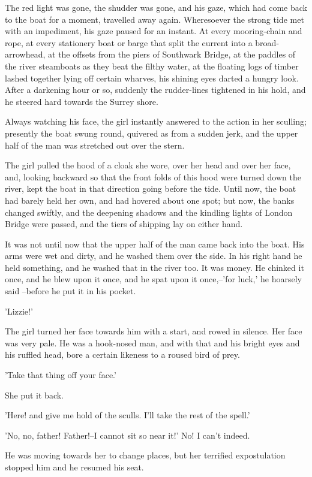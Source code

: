 The red light was gone, the shudder was gone, and his gaze, which
had come back to the boat for a moment, travelled away again.
Wheresoever the strong tide met with an impediment, his gaze
paused for an instant. At every mooring-chain and rope, at every
stationery boat or barge that split the current into a broad-arrowhead,
at the offsets from the piers of Southwark Bridge, at the
paddles of the river steamboats as they beat the filthy water, at the
floating logs of timber lashed together lying off certain wharves,
his shining eyes darted a hungry look. After a darkening hour or
so, suddenly the rudder-lines tightened in his hold, and he steered
hard towards the Surrey shore.

Always watching his face, the girl instantly answered to the action
in her sculling; presently the boat swung round, quivered as from a
sudden jerk, and the upper half of the man was stretched out over
the stern.

The girl pulled the hood of a cloak she wore, over her head and
over her face, and, looking backward so that the front folds of this
hood were turned down the river, kept the boat in that direction
going before the tide.
Until now, the boat had barely held her own,
and had hovered about one spot; but now, the banks changed
swiftly, and the deepening shadows and the kindling lights of
London Bridge were passed, and the tiers of shipping lay on either
hand.

It was not until now that the upper half of the man came back into
the boat. His arms were wet and dirty, and he washed them over
the side. In his right hand he held something, and he washed that
in the river too.
It was money.
He chinked it once, and he blew
upon it once, and he spat upon it once,--'for luck,' he hoarsely said
--before he put it in his pocket.

'Lizzie!'

The girl turned her face towards him with a start, and rowed in silence.
Her face was very pale.
He was a hook-nosed man, and
with that and his bright eyes and his ruffled head, bore a certain
likeness to a roused bird of prey.

'Take that thing off your face.'

She put it back.

'Here! and give me hold of the sculls. I'll take the rest of the spell.'

'No, no, father! Father!--I cannot sit so near it!' No!
I can't indeed.

He was moving towards her to change places, but her terrified
expostulation stopped him and he resumed his seat.

